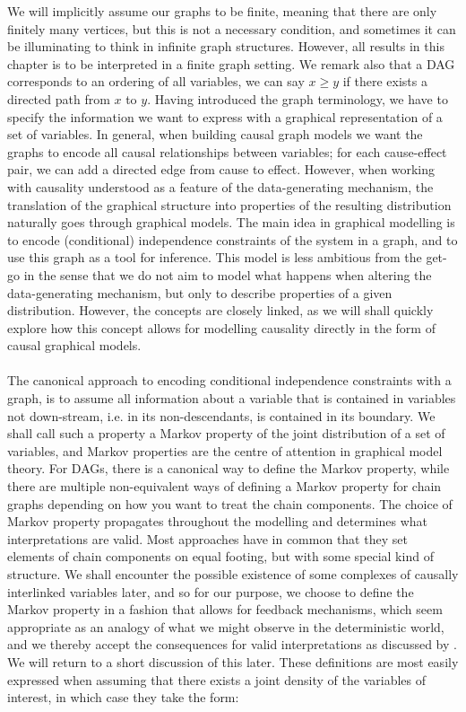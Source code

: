 \documentclass[11pt, a4paper]{memoir}
\theoremstyle{break}
\theoremstyle{break}
\theoremstyle{nonumberplain}
\begin{document}
We will implicitly assume our graphs to be finite, meaning that there are only finitely many vertices, but this is not a necessary condition, and sometimes it can be illuminating to think in infinite graph structures. However, all results in this chapter is to be interpreted in a finite graph setting. We remark also that a DAG corresponds to an ordering of all variables, we can say $x\geqslant y$ if there exists a directed path from $x$ to $y$. Having introduced the graph terminology, we have to specify the information we want to express with a graphical representation of a set of variables. In general, when building causal graph models we want the graphs to encode all causal relationships between variables; for each cause-effect pair, we can add a directed edge from cause to effect. However, when working with causality understood as a feature of the data-generating mechanism, the translation of the graphical structure into properties of the resulting distribution naturally goes through graphical models. The main idea in graphical modelling is to encode (conditional) independence constraints of the system in a graph, and to use this graph as a tool for inference. This model is less ambitious from the get-go in the sense that we do not aim to model what happens when altering the data-generating mechanism, but only to describe properties of a given distribution. However, the concepts are closely linked, as we will shall quickly explore how this concept allows for modelling causality directly in the form of causal graphical models.\\\\
The canonical approach to encoding conditional independence constraints with a graph, is to assume all information about a variable that is contained in variables not down-stream, i.e. in its non-descendants, is contained in its boundary. We shall call such a property a Markov property of the joint distribution of a set of variables, and Markov properties are the centre of attention in graphical model theory. For DAGs, there is a canonical way to define the Markov property, while there are multiple non-equivalent ways of defining a Markov property for chain graphs depending on how you want to treat the chain components. The choice of Markov property propagates throughout the modelling and determines what interpretations are valid. Most approaches have in common that they set elements of chain components on equal footing, but with some special kind of structure. We shall encounter the possible existence of some complexes of causally interlinked variables later, and so for our purpose, we choose to define the Markov property in a fashion that allows for feedback mechanisms, which seem appropriate as an analogy of what we might observe in the deterministic world, and we thereby accept the consequences for valid interpretations as discussed by \cite{ChainGraph}. We will return to a short discussion of this later. These definitions are most easily expressed when assuming that there exists a joint density of the variables of interest, in which case they take the form:
\end{document}
